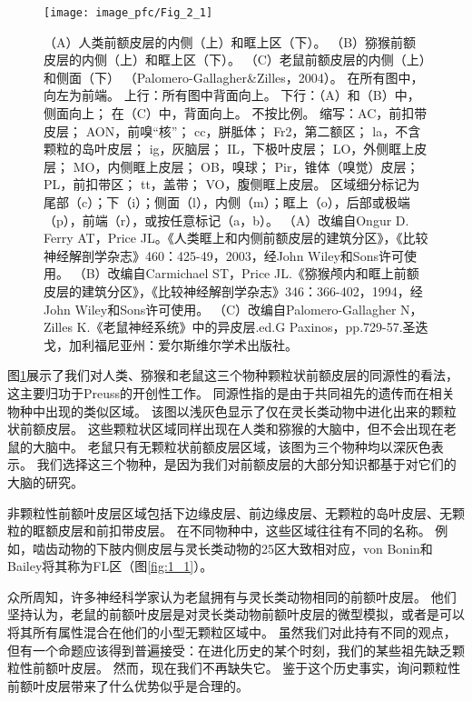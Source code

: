 \begin{figure}[!htb]
	\centering
	\texttt{[image: image\_pfc/Fig\_2\_1]}
	\caption{（A）人类前额皮层的内侧（上）和眶上区（下）\cite{ongur2003architectonic}。 
		（B）猕猴前额皮层的内侧（上）和眶上区（下）\cite{carmichael1994architectonic}。 
		（C）老鼠前额皮层的内侧（上）和侧面（下）
		（Palomero-Gallagher\&Zilles，2004）。
		在所有图中，向左为前端。
		上行：所有图中背面向上。
		下行：（A）和（B）中，侧面向上；
		在（C）中，背面向上。
		不按比例。
		缩写：AC，前扣带皮层；
		AON，前嗅“核”；
		cc，胼胝体；
		Fr2，第二额区；
		la，不含颗粒的岛叶皮层；
		ig，灰脑层；
		IL，下极叶皮层；
		LO，外侧眶上皮层；
		MO，内侧眶上皮层；
		OB，嗅球；
		Pir，锥体（嗅觉）皮层；
		PL，前扣带区；
		tt，盖带；
		VO，腹侧眶上皮层。
		区域细分标记为尾部（c）；下（i）；侧面（l），内侧（m）；眶上（o），后部或极端（p），前端（r），或按任意标记（a，b）。
		（A）改编自Ongur D. Ferry AT，Price JL。《人类眶上和内侧前额皮层的建筑分区》，《比较神经解剖学杂志》460：425-49，2003，经John Wiley和Sons许可使用。 
		（B）改编自Carmichael ST，Price JL.《猕猴颅内和眶上前额皮层的建筑分区》，《比较神经解剖学杂志》346：366-402，1994，经John Wiley和Sons许可使用。 
		（C）改编自Palomero-Gallagher N，Zilles K.《老鼠神经系统》中的异皮层.ed.G Paxinos，pp.729-57.圣迭戈，加利福尼亚州：爱尔斯维尔学术出版社。\label{fig:fig_2_1}}
\end{figure}

图\ref{fig:fig_2_1}展示了我们对人类、猕猴和老鼠这三个物种颗粒状前额皮层的同源性的看法，这主要归功于Preuss\cite{Preuss1991a}的开创性工作。
同源性指的是由于共同祖先的遗传而在相关物种中出现的类似区域。
该图以浅灰色显示了仅在灵长类动物中进化出来的颗粒状前额皮层。
这些颗粒状区域同样出现在人类和猕猴的大脑中，但不会出现在老鼠的大脑中。
老鼠只有无颗粒状前额皮层区域，该图为三个物种均以深灰色表示。
我们选择这三个物种，是因为我们对前额皮层的大部分知识都基于对它们的大脑的研究。


非颗粒性前额叶皮层区域包括下边缘皮层、前边缘皮层、无颗粒的岛叶皮层、无颗粒的眶额皮层和前扣带皮层。
在不同物种中，这些区域往往有不同的名称。
例如，啮齿动物的下肢内侧皮层与灵长类动物的25区大致相对应，von Bonin和Bailey将其称为FL区（图\ref{fig:1_1}）。


众所周知，许多神经科学家认为老鼠拥有与灵长类动物相同的前额叶皮层。
他们坚持认为，老鼠的前额叶皮层是对灵长类动物前额叶皮层的微型模拟，或者是可以将其所有属性混合在他们的小型无颗粒区域中\cite{kolb2007all,seamans2008comparing,schoenbaum2009new}。
虽然我们对此持有不同的观点，但有一个命题应该得到普遍接受：在进化历史的某个时刻，我们的某些祖先缺乏颗粒性前额叶皮层。
然而，现在我们不再缺失它。
鉴于这个历史事实，询问颗粒性前额叶皮层带来了什么优势似乎是合理的。



